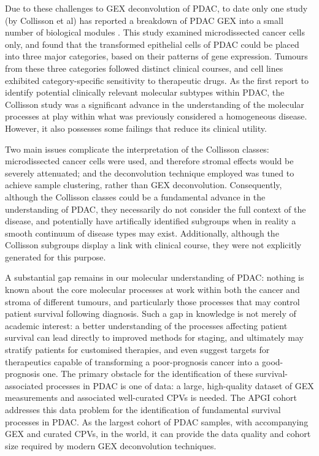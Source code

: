\documentclass[dissertation.tex]{subfiles}
\begin{document}
Due to these challenges to \gls{GEX} deconvolution of \gls{PDAC}, to date only one study (by Collisson et al) has reported a breakdown of \gls{PDAC} \gls{GEX} into a small number of biological modules \cite{Collisson2011}.  This study examined microdissected cancer cells only, and found that the transformed epithelial cells of \gls{PDAC} could be placed into three major categories, based on their patterns of gene expression.  Tumours from these three categories followed distinct clinical courses, and cell lines exhibited category-specific sensitivity to therapeutic drugs.  As the first report to identify potential clinically relevant molecular subtypes within \gls{PDAC}, the Collisson study was a significant advance in the understanding of the molecular processes at play within what was previously considered a homogeneous disease.  However, it also possesses some failings that reduce its clinical utility.

Two main issues complicate the interpretation of the Collisson classes: microdissected cancer cells were used, and therefore stromal effects would be severely attenuated; and the deconvolution technique employed was tuned to achieve sample clustering, rather than \gls{GEX} deconvolution.  Consequently, although the Collisson classes could be a fundamental advance in the understanding of \gls{PDAC}, they necessarily do not consider the full context of the disease, and potentially have artifically identified subgroups when in reality a smooth continuum of disease types may exist.  Additionally, although the Collisson subgroups display a link with clinical course, they were not explicitly generated for this purpose.

A substantial gap remains in our molecular understanding of \gls{PDAC}: nothing is known about the core molecular processes at work within both the cancer and stroma of different tumours, and particularly those processes that may control patient survival following diagnosis.  Such a gap in knowledge is not merely of academic interest: a better understanding of the processes affecting patient survival can lead directly to improved methods for staging, and ultimately may stratify patients for customised therapies, and even suggest targets for therapeutics capable of transforming a poor-prognosis cancer into a good-prognosis one.  The primary obstacle for the identification of these survival-associated processes in \gls{PDAC} is one of data: a large, high-quality dataset of \gls{GEX} measurements and associated well-curated \glspl{CPV} is needed.  The \gls{APGI} cohort addresses this data problem for the identification of fundamental survival processes in \gls{PDAC}.  As the largest cohort of \gls{PDAC} samples, with accompanying \gls{GEX} and curated \glspl{CPV}, in the world, it can provide the data quality and cohort size required by modern \gls{GEX} deconvolution techniques.
\end{document}
